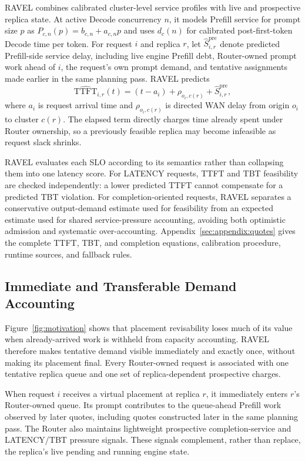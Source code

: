 \documentclass[letterpaper,twocolumn,10pt]{article}
\begin{document}
RAVEL combines calibrated cluster-level service profiles with live and
prospective replica state.
At active Decode concurrency $n$, it models Prefill service for prompt size
$p$ as
$P_{c,n}(p)=b_{c,n}+a_{c,n}p$ and uses $d_c(n)$ for calibrated
post-first-token Decode time per token.
For request $i$ and replica $r$, let
$\widehat{S}^{\mathrm{pre}}_{i,r}$ denote predicted Prefill-side service delay,
including live engine Prefill debt, Router-owned prompt work ahead of $i$, the
request's own prompt demand, and tentative assignments made earlier in the
same planning pass.
RAVEL predicts
\begin{equation}
    \widehat{\mathrm{TTFT}}_{i,r}(t)
    =
    (t-a_i)
    +
    \rho_{o_i,c(r)}
    +
    \widehat{S}^{\mathrm{pre}}_{i,r},
    \label{eq:ravel-ttft}
\end{equation}
where $a_i$ is request arrival time and
$\rho_{o_i,c(r)}$ is directed WAN delay from origin $o_i$ to cluster $c(r)$.
The elapsed term directly charges time already spent under Router ownership,
so a previously feasible replica may become infeasible as request slack
shrinks.

RAVEL evaluates each SLO according to its semantics rather than collapsing
them into one latency score.
For LATENCY requests, TTFT and TBT feasibility are checked independently:
a lower predicted TTFT cannot compensate for a predicted TBT violation.
For completion-oriented requests, RAVEL separates a conservative
output-demand estimate used for feasibility from an expected estimate used
for shared service-pressure accounting, avoiding both optimistic admission
and systematic over-accounting.
Appendix~\ref{sec:appendix:quotes} gives the complete TTFT, TBT, and completion
equations, calibration procedure, runtime sources, and fallback rules.


\subsection{Immediate and Transferable Demand Accounting}
\label{sec:design:accounting}

Figure~\ref{fig:motivation} shows that placement revisability loses much of its
value when already-arrived work is withheld from capacity accounting.
RAVEL therefore makes tentative demand visible immediately and exactly once,
without making its placement final.
Every Router-owned request is associated with one tentative replica queue and
one set of replica-dependent prospective charges.

When request $i$ receives a virtual placement at replica $r$, it immediately
enters $r$'s Router-owned queue.
Its prompt contributes to the queue-ahead Prefill work observed by later
quotes, including quotes constructed later in the same planning pass.
The Router also maintains lightweight prospective completion-service and
LATENCY/TBT pressure signals.
These signals complement, rather than replace, the replica's live pending and
running engine state.
\end{document}
